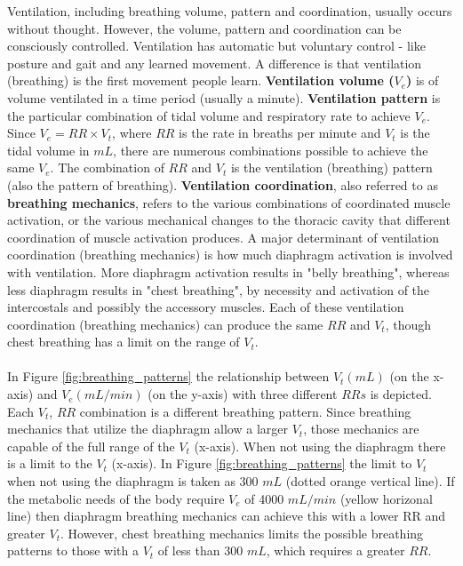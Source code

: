 Ventilation, including breathing volume, pattern and coordination, usually occurs without thought. However, the volume, pattern and coordination can be consciously controlled. Ventilation has automatic but voluntary control - like posture and gait and any learned movement. A difference is that ventilation (breathing) is the first movement people learn. 
\textbf{Ventilation volume ($V_e$)} is of volume ventilated in a time period (usually a minute). 
\textbf{Ventilation pattern} is the particular combination of tidal volume and respiratory rate to achieve $V_e$. Since $V_e = RR \times V_t$, where $RR$ is the rate in breaths per minute and $V_t$ is the tidal volume in $mL$, there are numerous combinations possible to achieve the same $V_e$. The combination of $RR$ and $V_t$ is the ventilation (breathing) pattern (also the pattern of breathing). 
\textbf{Ventilation coordination}, also referred to as \textbf{breathing mechanics}, refers to the various combinations of coordinated muscle activation, or the various mechanical changes to the thoracic cavity that different coordination of muscle activation produces. A major determinant of ventilation coordination (breathing mechanics) is how much diaphragm activation is involved with ventilation. More diaphragm activation results in "belly breathing", whereas less diaphragm results in "chest breathing", by necessity and activation of the intercostals and possibly the accessory muscles. Each of these ventilation coordination (breathing mechanics) can produce the same $RR$ and $V_t$, though chest breathing has a limit on the range of $V_t$.

\paragraph{} In Figure \ref{fig:breathing_patterns} the relationship between $V_t (mL)$ (on the x-axis) and $V_e (mL/min)$ (on the y-axis) with three different $RRs$ is depicted. Each $V_t$, $RR$ combination is a different breathing pattern. Since breathing mechanics that utilize the diaphragm allow a larger $V_t$, those mechanics are capable of the full range of the $V_t$ (x-axis). When not using the diaphragm there is a limit to the $V_t$ (x-axis). In Figure \ref{fig:breathing_patterns} the limit to $V_t$ when not using the diaphragm is taken as 300 $mL$ (dotted orange vertical line). If the metabolic needs of the body require $V_e$ of 4000 $mL/min$ (yellow horizonal line) then diaphragm breathing mechanics can achieve this with a lower RR and greater $V_t$. However, chest breathing mechanics limits the possible breathing patterns to those with a $V_t$ of less than 300 $mL$, which requires a greater $RR$.

